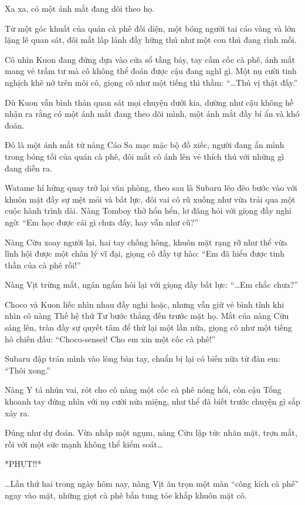 \documentclass[../main.tex]{subfiles}
\begin{document}
Xa xa, có một ánh mắt đang dõi theo họ.

Từ một góc khuất của quán cà phê đối diện, một bóng người tai cáo vàng và lớn lặng lẽ quan sát, đôi mắt lấp lánh đầy hứng thú như một con thú đang rình mồi.

Cô nhìn Kuon đang đứng dựa vào cửa sổ tầng bảy, tay cầm cốc cà phê, ánh mắt mang vẻ trầm tư mà cô không thể đoán được cậu đang nghĩ gì. Một nụ cười tinh nghịch khẽ nở trên môi cô, giọng cô như một tiếng thì thầm: ``\dots Thú vị thật đấy.''

Dù Kuon vẫn bình thản quan sát mọi chuyện dưới kia, dường như cậu không hề nhận ra rằng có một ánh mắt đang theo dõi mình, một ánh mắt đầy bí ẩn và khó đoán.

Đó là một ánh mắt từ nàng Cáo Sa mạc mặc bộ đồ xiếc, người đang ẩn mình trong bóng tối của quán cà phê, đôi mắt cô ánh lên vẻ thích thú với những gì đang diễn ra.

\il

Watame hí hửng quay trở lại văn phòng, theo sau là Subaru lẽo đẽo bước vào với khuôn mặt đầy sự mệt mỏi và bất lực, đôi vai cô rũ xuống như vừa trải qua một cuộc hành trình dài. Nàng Tomboy thở hổn hển, lơ đãng hỏi với giọng đầy nghi ngờ: ``Em học được cái gì chưa đấy, hay vẫn như cũ?''

Nàng Cừu xoay người lại, hai tay chống hông, khuôn mặt rạng rỡ như thể vừa lĩnh hội được một chân lý vĩ đại, giọng cô đầy tự hào: ``Em đã hiểu được tinh thần của cà phê rồi!''

Nàng Vịt trừng mắt, ngán ngẩm hỏi lại với giọng đầy bất lực: ``\dots Em chắc chưa?''

Choco và Kuon liếc nhìn nhau đầy nghi hoặc, nhưng vẫn giữ vẻ bình tĩnh khi nhìn cô nàng Thế hệ thứ Tư bước thẳng đến trước mặt họ. Mắt của nàng Cừu sáng lên, tràn đầy sự quyết tâm để thử lại một lần nữa, giọng cô như một tiếng hô chiến đấu: ``Choco-sensei! Cho em xin một cốc cà phê!''

Subaru đập trán mình vào lòng bàn tay, chuẩn bị lại có biến nữa từ đàn em: ``Thôi xong.''

Nàng Y tá nhún vai, rót cho cô nàng một cốc cà phê nóng hổi, còn cậu Tổng khoanh tay đứng nhìn với nụ cười nửa miệng, như thể đã biết trước chuyện gì sắp xảy ra.

Đúng như dự đoán. Vừa nhấp một ngụm, nàng Cừu lập tức nhăn mặt, trợn mắt, rồi với một sức mạnh không thể kiểm soát\dots

*PHỤT!!*

\dots Lần thứ hai trong ngày hôm nay, nàng Vịt ăn trọn một màn ``công kích cà phê'' ngay vào mặt, những giọt cà phê bắn tung tóe khắp khuôn mặt cô.
\end{document}
